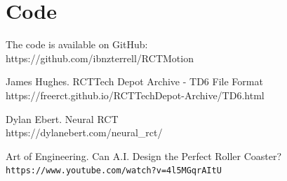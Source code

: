 \documentclass[12pt]{article}
\begin{document}
\section*{Code}
The code is available on GitHub:\\
https://github.com/ibnzterrell/RCTMotion

\begin{thebibliography}{9}
    James Hughes. RCTTech Depot Archive - TD6 File Format\\
    https://freerct.github.io/RCTTechDepot-Archive/TD6.html

    Dylan Ebert. Neural RCT\\
    https://dylanebert.com/neural\_rct/

    Art of Engineering. Can A.I. Design the Perfect Roller Coaster?\\
    \texttt{https://www.youtube.com/watch?v=4l5MGqrAItU}
\end{thebibliography}
\end{document}
